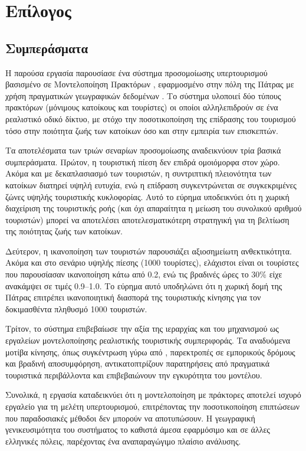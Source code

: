 \chapter{Επίλογος}

\section{Συμπεράσματα}

Η παρούσα εργασία παρουσίασε ένα σύστημα προσομοίωσης υπερτουρισμού
βασισμένο σε Μοντελοποίηση Πρακτόρων , εφαρμοσμένο στην
πόλη της Πάτρας με χρήση πραγματικών γεωγραφικών δεδομένων 
. Το σύστημα υλοποιεί δύο τύπους πρακτόρων
(μόνιμους κατοίκους και τουρίστες) οι οποίοι αλληλεπιδρούν σε ένα
ρεαλιστικό οδικό δίκτυο, με στόχο την ποσοτικοποίηση της επίδρασης
του τουρισμού τόσο στην ποιότητα ζωής των κατοίκων όσο και στην
εμπειρία των επισκεπτών.

Τα αποτελέσματα των τριών σεναρίων προσομοίωσης αναδεικνύουν τρία βασικά
συμπεράσματα. Πρώτον, η τουριστική πίεση δεν επιδρά ομοιόμορφα στον
χώρο. Ακόμα και με δεκαπλασιασμό των τουριστών, η συντριπτική
πλειονότητα των κατοίκων διατηρεί υψηλή ευτυχία, ενώ η επίδραση
συγκεντρώνεται σε συγκεκριμένες ζώνες υψηλής τουριστικής κυκλοφορίας.
Αυτό το εύρημα υποδεικνύει ότι η χωρική διαχείριση της τουριστικής ροής
(και όχι απαραίτητα η μείωση του συνολικού αριθμού τουριστών)
μπορεί να αποτελέσει αποτελεσματικότερη στρατηγική για τη βελτίωση της
ποιότητας ζωής των κατοίκων.

Δεύτερον, η ικανοποίηση των τουριστών παρουσιάζει αξιοσημείωτη
ανθεκτικότητα. Ακόμα και στο σενάριο υψηλής πίεσης (1000 τουρίστες),
ελάχιστοι είναι οι τουρίστες που παρουσίασαν ικανοποίηση κάτω από 0.2,
ενώ τις βραδινές ώρες το 30\% είχε ανακάμψει σε τιμές 0.9–1.0.
Το εύρημα αυτό υποδηλώνει ότι η χωρική δομή της Πάτρας επιτρέπει
ικανοποιητική διασπορά της τουριστικής κίνησης για τον δοκιμασθέντα
πληθυσμό 1000 τουριστών.

Τρίτον, το σύστημα επιβεβαίωσε την αξία της ιεραρχίας  και
του μηχανισμού  ως εργαλείων μοντελοποίησης
ρεαλιστικής τουριστικής συμπεριφοράς. Τα αναδυόμενα μοτίβα κίνησης,
όπως συγκέντρωση γύρω από , παρεκτροπές σε εμπορικούς
δρόμους και βραδινή αποσυμφόρηση, αντικατοπτρίζουν παρατηρήσεις από
πραγματικά τουριστικά περιβάλλοντα και επιβεβαιώνουν την εγκυρότητα
του μοντέλου.

Συνολικά, η εργασία καταδεικνύει ότι η μοντελοποίηση με πράκτορες
αποτελεί ισχυρό εργαλείο για τη μελέτη υπερτουρισμού, επιτρέποντας
την ποσοτικοποίηση επιπτώσεων που παραδοσιακές μέθοδοι δεν μπορούν
να αποτυπώσουν. Η γεωγραφική γενικευσιμότητα του συστήματος το
καθιστά άμεσα εφαρμόσιμο και σε άλλες ελληνικές πόλεις, παρέχοντας
ένα αναπαραγώγιμο πλαίσιο ανάλυσης.

